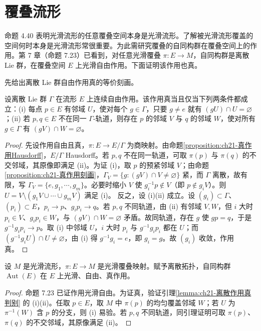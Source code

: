 \documentclass[../../main.tex]{subfiles}
\begin{document}
\section{覆叠流形}\label{section:ch21-covering-manifolds}

命题 4.40 表明光滑流形的任意覆叠空间本身是光滑流形。了解被光滑流形覆盖的空间何时本身是光滑流形常很重要。为此需研究覆叠的自同构群在覆叠空间上的作用。第 7 章（命题 7.23）已看到，对任意光滑覆叠 $\pi\colon E\to M$，自同构群是离散 Lie 群，在覆叠空间 $E$ 上光滑自由作用。下面证明该作用也真。

先给出离散 Lie 群自由作用真的等价刻画。

\begin{lemma}\label{lemma:ch21-离散作用真判别}
设离散 Lie 群 $\Gamma$ 在流形 $E$ 上连续自由作用。该作用真当且仅当下列两条件都成立：(i) 每点 $p\in E$ 有邻域 $U$，使对每个 $g\in\Gamma$，只要 $g\neq e$ 就有 $(gU)\cap U=\varnothing$；(ii) 若 $p,q\in E$ 不在同一 $\Gamma$-轨道，则存在 $p$ 的邻域 $V$ 与 $q$ 的邻域 $W$，使对所有 $g\in\Gamma$ 有 $(gV)\cap W=\varnothing$。
\end{lemma}

\begin{proof}
先设作用自由且真，$\pi\colon E\to E/\Gamma$ 为商映射。由命题\cref{proposition:ch21-真作用Hausdorff}，$E/\Gamma$ Hausdorff。若 $p,q$ 不在同一轨道，可取 $\pi(p)$ 与 $\pi(q)$ 的不交邻域，其原像即满足 (ii)。为证 (i)，取 $p$ 的预紧邻域 $V$；由命题\cref{proposition:ch21-真作用刻画}，$\Gamma_V=\{g\colon(gV)\cap V\neq\varnothing\}$ 紧，而 $\Gamma$ 离散，故有限，写 $\Gamma_V=\{e,g_1,\cdots ,g_m\}$。必要时缩小 $V$ 使 $g_i^{-1}p\notin V$（即 $p\notin g_i V$）。则 $U=V\setminus(g_1 V\cup\cdots\cup g_m V)$ 满足 (i)。
反之，设 (i)(ii) 成立。设 $(g_i)\subset\Gamma$、$(p_i)\subset E$，$p_i\to p$、$g_i p_i\to q$。若 $p,q$ 不同轨道，由 (ii) 有邻域 $V,W$，但 $i$ 大时 $p_i\in V$、$g_i p_i\in W$，与 $(gV)\cap W=\varnothing$ 矛盾。故同轨道，存在 $g$ 使 $gp=q$，于是 $g^{-1}g_i p_i\to p$。取 (i) 中邻域 $U$，$i$ 大时 $p_i$ 与 $g^{-1}g_i p_i$ 都在 $U$；而 $(g^{-1}g_i U)\cap U\neq\varnothing$，由 (i) 得 $g^{-1}g_i=e$，即 $g_i=g$。故 $(g_i)$ 收敛，作用真。
\end{proof}

\begin{proposition}\label{proposition:ch21-自同构群作用真}
设 $M$ 是光滑流形，$\pi\colon E\to M$ 是光滑覆叠映射。赋予离散拓扑，自同构群 $\operatorname{Aut}(E)$ 在 $E$ 上光滑、自由、真作用。
\end{proposition}

\begin{proof}
命题 7.23 已证作用光滑自由。为证真，验证引理\cref{lemma:ch21-离散作用真判别} 的 (i)(ii)。任取 $p\in E$，取 $M$ 中 $\pi(p)$ 的均匀覆盖邻域 $W$；若 $U$ 为 $\pi^{-1}(W)$ 含 $p$ 的分支，则 (i) 易验。若 $p,q$ 不同轨道，同引理证明可取 $\pi(p)$、$\pi(q)$ 的不交邻域，其原像满足 (ii)。
\end{proof}
\end{document}
